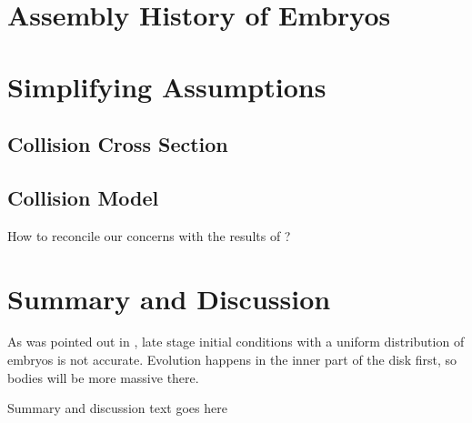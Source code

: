 \documentclass[twocolumn]{aastex63}
\begin{document}


\section{Assembly History of Embryos}


\section{Simplifying Assumptions}\label{sec:assump}

\subsection{Collision Cross Section}


\subsection{Collision Model}


How to reconcile our concerns with the results of \citet{wallace17}?

\section{Summary and Discussion} \label{sec:discuss}

As was pointed out in \citet{clement20},  late stage initial conditions with a uniform distribution of embryos is not accurate. Evolution happens in the inner part of the disk first, so bodies will be more massive there.

Summary and discussion text goes here



\clearpage
\end{document}

